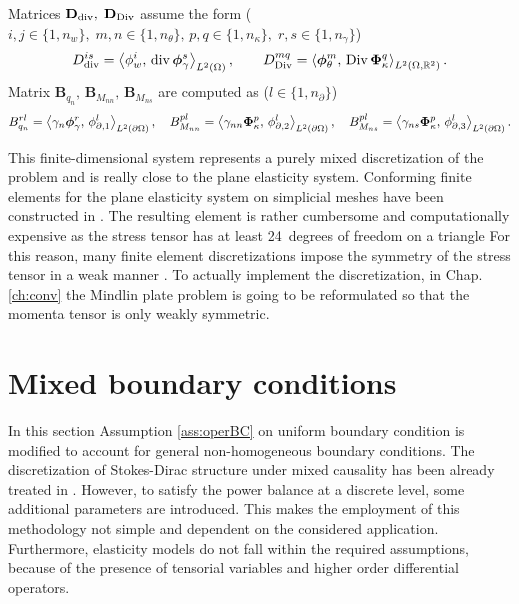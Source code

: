 Matrices $\mathbf{D}_{\div}, \; \mathbf{D}_{\Div}$ assume the form ($i, j \in \{1, n_w\}, \; m, n \in \{1, n_\theta\}, \, p, q \in \{1, n_\kappa\}, \; r, s \in \{1, n_\gamma\}$)
\begin{equation}
D_{\div}^{is} = \inner[L^2(\Omega)]{\phi_w^i}{\div \bm\phi_\gamma^s}, \qquad D_{\Div}^{mq} = \inner[L^2(\Omega, \mathbb{R}^2)]{\bm\phi_\theta^m}{\Div \bm\Phi_\kappa^q}.
\end{equation}
Matrix $\mathbf{B}_{q_n}, \, \mathbf{B}_{M_{nn}}, \, \mathbf{B}_{M_{ns}}$ are computed as ($l \in \{1, n_\partial\}$)
\begin{equation}
{B}_{q_n}^{rl} = \inner[L^2(\partial\Omega)]{\gamma_n \bm\phi_\gamma^r}{\phi_{\partial, 1}^l}, \quad {B}_{M_{nn}}^{pl} = \inner[L^2(\partial\Omega)]{\gamma_{nn} \bm\Phi_\kappa^p}{\phi_{\partial, 2}^l},  \quad {B}_{M_{ns}}^{pl} = \inner[L^2(\partial\Omega)]{\gamma_{ns} \bm\Phi_\kappa^p}{\phi_{\partial, 3}^l}.
\end{equation}

This finite-dimensional system represents a purely mixed discretization of the problem and is really close to the plane elasticity system. Conforming finite elements for the plane elasticity system on simplicial meshes have been constructed in \cite{arnold2002mixed}. The resulting element is rather cumbersome and computationally expensive as the stress tensor has at least 24~degrees of freedom on a triangle  For this reason, many finite element discretizations impose the symmetry of the stress tensor in a weak manner \cite{arnold2007mixed}. To actually implement the discretization, in Chap. \ref{ch:conv} the Mindlin plate problem is going to be reformulated so that the momenta tensor is only weakly symmetric. 


\section{Mixed boundary conditions}\label{sec:mixedbc}
In this section Assumption \ref{ass:operBC} on uniform boundary condition is modified to account for general non-homogeneous boundary conditions. The discretization of Stokes-Dirac structure under mixed causality has been already treated in \cite{kotyczka2018weak}. However, to satisfy the power balance at a discrete level, some additional parameters are introduced. This makes the employment of this methodology not simple and dependent on the considered application. Furthermore, elasticity models do not fall within the required assumptions, because of the presence of tensorial variables and higher order differential operators. \\

